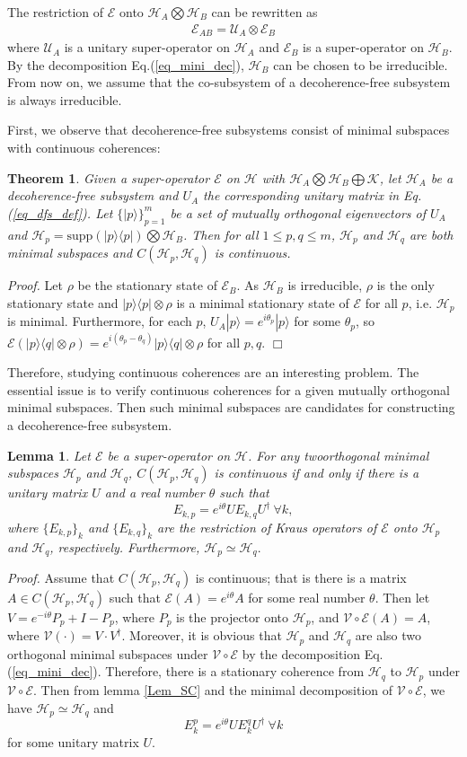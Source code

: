 \documentclass[journal]{IEEEtran}
\def\h{\ensuremath{\mathcal{H}}}
\def\u{\ensuremath{\mathcal{U}}}
\def\k{\ensuremath{\mathcal{K}}}
\def\u{\ensuremath{\mathcal{U}}}
\def\v{\ensuremath{\mathcal{V}}}
\def\e{\ensuremath{\mathcal{E}}}
\def\k{\mathcal{K}}
\newtheorem{theorem}{Theorem}
\newtheorem{lemma}{Lemma}
\begin{document}
The restriction of $\e$ onto $\h_A\bigotimes\h_B $ can be rewritten as \begin{eqnarray}\label{eq_dfs_form}
  \e_{AB}=\u_A\otimes \e_{B}
\end{eqnarray} where $\u_A$ is a unitary super-operator  on $\h_A$ and $\e_B$ is a super-operator on $\h_{B}.$ By the decomposition Eq.(\ref{eq_mini_dec}), $\h_B$ can be chosen to be  irreducible. From now on, we assume that the co-subsystem of a decoherence-free subsystem is always irreducible.

First, we observe that  decoherence-free subsystems consist of minimal subspaces with continuous coherences:
\begin{theorem}\label{Theo_dfs_cc}
    Given a super-operator $\e$ on $\h$ with $\h_A\bigotimes\h_B\bigoplus \k$, let $\h_A$ be a decoherence-free subsystem and $U_A$  the corresponding unitary matrix in Eq.(\ref{eq_dfs_def}). Let  $\{|p\rangle\}_{p=1}^{m}$ be a set of mutually orthogonal eigenvectors of $U_A$ and $\h_p=\textrm{supp}(|p\rangle\langle p|)\bigotimes \h_B$. Then for all $1\leq p,q\leq m$,  $\h_p$ and $\h_q$ are both minimal subspaces and
    $C(\h_p,\h_q)$ is continuous.
  \end{theorem}  

{\it Proof.} Let $\rho$ be the stationary state of $\e_B$. As $\h_B$ is irreducible, $\rho$ is the only stationary state and $|p\rangle\langle p|\otimes \rho$ is a minimal stationary state of $\e$ for all $p$, i.e. $\h_p$ is minimal. Furthermore, for each $p$, $U_A|p\rangle=e^{i\theta_p}|p\rangle$ for some $\theta_p$, so  $\e(|p\rangle\langle q|\otimes \rho)=e^{i(\theta_p-\theta_q)}|p\rangle\langle q|\otimes \rho$ for all $p,q.$
\hfill $\Box$

Therefore, studying continuous coherences are an interesting problem. The essential issue is to verify continuous coherences for a given mutually orthogonal minimal subspaces. Then such minimal subspaces are candidates for constructing a decoherence-free subsystem.
\begin{lemma}\label{lem_block_eq}
  Let $\e$ be a super-operator on $\h$. For any twoorthogonal minimal subspaces $\h_p$ and $\h_q$,  $C(\h_p,\h_q)$ is continuous if and only if  there is a unitary matrix $U$ and a real number $\theta$ such that 
  $$E_{k,p}=e^{i\theta}UE_{k,q}U^\dagger \ \forall k,$$  where $\{E_{k,p}\}_k$ and $\{E_{k,q}\}_k$ are the restriction of Kraus operators of $\e$ onto $\h_p$ and $\h_q$, respectively.  Furthermore, $\h_p\simeq\h_q.$ 
\end{lemma}
{\it Proof.} 
Assume that $C(\h_p,\h_q)$ is continuous; that is  there is a matrix $A\in C(\h_p,\h_q)$ such that $\e(A)=e^{i\theta}A$ for some real number $\theta$. Then let $V=e^{-i\theta}P_p+I-P_p$, where $P_p$ is the projector onto $\h_p$,  and  $\v\circ\e(A)=A$, where $\v(\cdot)=V\cdot V^\dagger$. Moreover, it is obvious that $\h_p$ and $\h_q$ are also two orthogonal minimal subspaces under $\v\circ\e$  by the decomposition Eq.(\ref{eq_mini_dec}). Therefore, there is a stationary coherence from $\h_q$ to $\h_p$ under $\v\circ\e.$ Then from lemma \ref{Lem_SC} and the minimal decomposition of $\v\circ\e$, we have $\h_p\simeq\h_q$ and 
$$E_k^p=e^{i\theta }UE_k^qU^\dagger \ \forall k$$ for some unitary matrix $U$.
\end{document}
